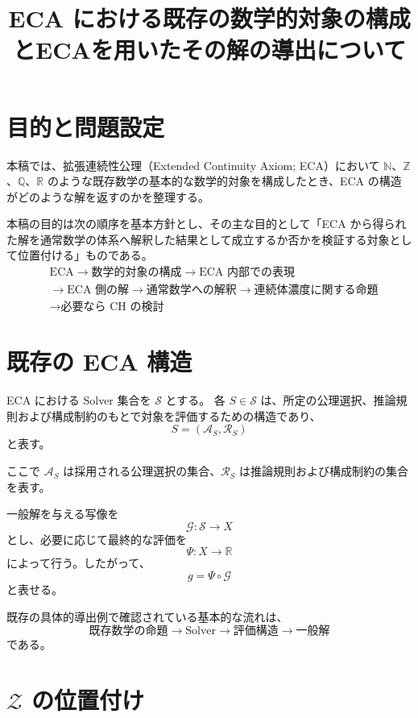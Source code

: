 \documentclass[a4paper,11pt]{article}
\title{ECA における既存の数学的対象の構成とECAを用いたその解の導出について}
\author{}
\date{}
\begin{document}
\maketitle

\section{目的と問題設定}
\label{sec:introduction}

本稿では、拡張連続性公理（Extended Continuity Axiom; ECA）において $\mathbb{N}$、$\mathbb{Z}$、$\mathbb{Q}$、$\mathbb{R}$ のような既存数学の基本的な数学的対象を構成したとき、ECA の構造がどのような解を返すのかを整理する。

本稿の目的は次の順序を基本方針とし、その主な目的として「ECA から得られた解を通常数学の体系へ解釈した結果として成立するか否かを検証する対象として位置付ける」ものである。
\[
\boxed{
\begin{aligned}
&\text{ECA}
\longrightarrow
\text{数学的対象の構成}
\longrightarrow
\text{ECA 内部での表現}\\
&\longrightarrow
\text{ECA 側の解}
\longrightarrow
\text{通常数学への解釈}
\longrightarrow
\text{連続体濃度に関する命題}\\
&\longrightarrow
\text{必要なら CH の検討}
\end{aligned}}
\]


\section{既存の ECA 構造}
\label{sec:existing-structure}

ECA における Solver 集合を $\mathcal{S}$ とする。
各 $S\in\mathcal{S}$ は、所定の公理選択、推論規則および構成制約のもとで対象を評価するための構造であり、
\[
\boxed{S=(\mathcal{A}_S,\mathcal{R}_S)}
\]
と表す。

ここで $\mathcal{A}_S$ は採用される公理選択の集合、$\mathcal{R}_S$ は推論規則および構成制約の集合を表す。

一般解を与える写像を
\[
\mathcal{G}:\mathcal{S}\longrightarrow X
\]
とし、必要に応じて最終的な評価を
\[
\Psi:X\longrightarrow\mathbb{R}
\]
によって行う。したがって、
\[
g=\Psi\circ\mathcal{G}
\]
と表せる。

既存の具体的導出例で確認されている基本的な流れは、
\[
\boxed{
\text{既存数学の命題}
\longrightarrow
\text{Solver}
\longrightarrow
\text{評価構造}
\longrightarrow
\text{一般解}}
\]
である。

\section{$\mathcal{Z}$ の位置付け}
\label{sec:Z-position}
\end{document}

